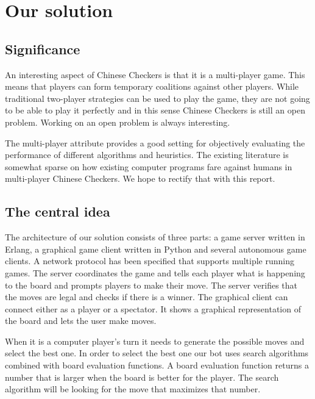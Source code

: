 \section{Our solution}
\subsection{Significance}

An interesting aspect of Chinese Checkers is that it is a multi-player
game. This means that players can form temporary coalitions against
other players. While traditional two-player strategies can be used to
play the game, they are not going to be able to play it perfectly and
in this sense Chinese Checkers is still an open problem. Working on an
open problem is always interesting.

The multi-player attribute provides a good setting for objectively
evaluating the performance of different algorithms and heuristics. The
existing literature is somewhat sparse on how existing computer
programs fare against humans in multi-player Chinese Checkers. We hope
to rectify that with this report.

\subsection{The central idea}

The architecture of our solution consists of three parts: a game
server written in Erlang, a graphical game client written in Python
and several autonomous game clients. A network protocol has been
specified that supports multiple running games. The server coordinates
the game and tells each player what is happening to the board and
prompts players to make their move. The server verifies that the moves
are legal and checks if there is a winner. The graphical client can
connect either as a player or a spectator. It shows a graphical
representation of the board and lets the user make moves.

When it is a computer player's turn it needs to generate the possible
moves and select the best one. In order to select the best one our bot
uses search algorithms combined with board evaluation functions. A
board evaluation function returns a number that is larger when the
board is better for the player. The search algorithm will be looking
for the move that maximizes that number.


